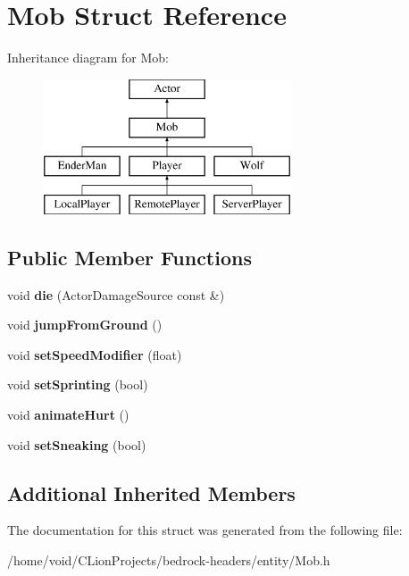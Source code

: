 \hypertarget{struct_mob}{}\section{Mob Struct Reference}
\label{struct_mob}
Inheritance diagram for Mob\+:\begin{figure}[H]
\begin{center}
\leavevmode
\includegraphics[height=4.000000cm]{struct_mob}
\end{center}
\end{figure}
\subsection*{Public Member Functions}
\begin{DoxyCompactItemize}
\item 
\mbox{\label{struct_mob_a0bbab401b975ec95ef48f27a4f151b1f}} 
void {\bfseries die} (Actor\+Damage\+Source const \&)
\item 
\mbox{\label{struct_mob_a897074ead60bd65d28669ab421cbd9a8}} 
void {\bfseries jump\+From\+Ground} ()
\item 
\mbox{\label{struct_mob_a6c8a6e5647f070688c07296f5651b481}} 
void {\bfseries set\+Speed\+Modifier} (float)
\item 
\mbox{\label{struct_mob_ad0263fa6e03f7eb55f23c123d90c828b}} 
void {\bfseries set\+Sprinting} (bool)
\item 
\mbox{\label{struct_mob_a06ecb36a57eaaab9ec9a48be6152276d}} 
void {\bfseries animate\+Hurt} ()
\item 
\mbox{\label{struct_mob_abe22cd395af5971a3e7353e400475fe5}} 
void {\bfseries set\+Sneaking} (bool)
\end{DoxyCompactItemize}
\subsection*{Additional Inherited Members}


The documentation for this struct was generated from the following file\+:\begin{DoxyCompactItemize}
\item 
/home/void/\+C\+Lion\+Projects/bedrock-\/headers/entity/Mob.\+h\end{DoxyCompactItemize}
